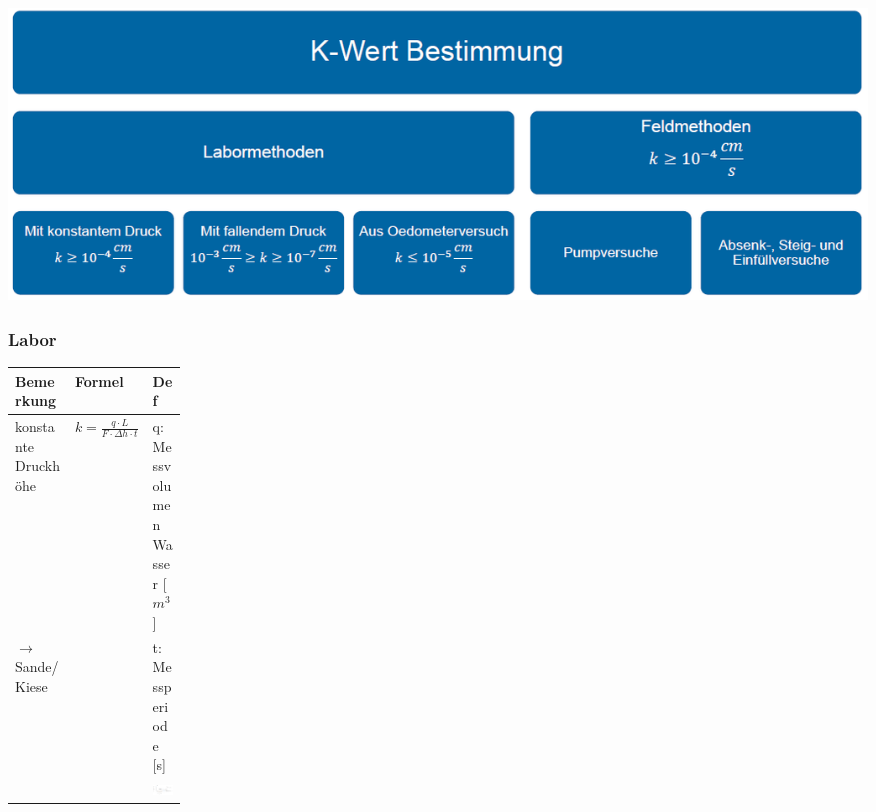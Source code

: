\begin{minipage}{0.5\linewidth}
	\includegraphics[width=\linewidth]{images/GW4Durchlaessigkeit.PNG} \\
\end{minipage}




\begin{landscape}


\begin{minipage}{0.5\linewidth}
	\subsubsection{Labor}
	
	\begin{tabular}{l|l|p{0.2\linewidth}}
		Bemerkung	& Formel			&	Def	 \\ \hline
		
		konstante Druckhöhe 	&	$ k = \frac{q \cdot L}{F \cdot \Delta h \cdot t} $	& q: Messvolumen Wasser [$m^3$] \\
		$ \rightarrow $ Sande/Kiese &	& t: Messperiode [s] \\ 
					&					& \includegraphics[width=\linewidth]{images/GW3Darcy.PNG} \\ \hline
		

\end{tabular}
\end{minipage}
\end{landscape}

